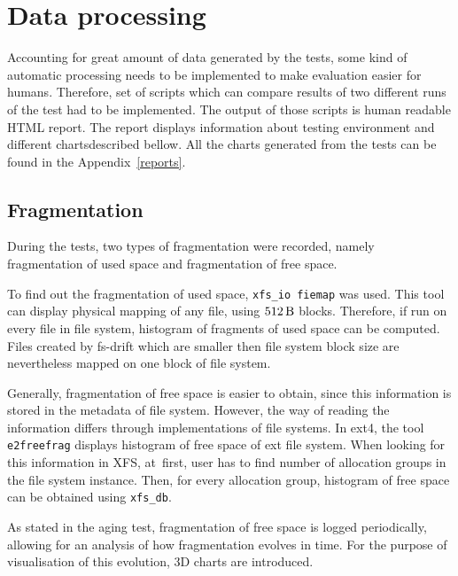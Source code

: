 \documentclass[
  color, %
  table, %
  lof,   %
  lot,   %
]{fithesis3}
\begin{document}
\section{Data processing}
Accounting for great amount of data generated by the tests, some kind of automatic processing needs to be implemented to make evaluation easier for humans. Therefore, set of scripts which can compare results of two different runs of the test had to be implemented. The output of those scripts is human readable HTML report\footnotemark[1]. The report displays information about testing environment and different charts\footnotemark[2] described bellow. All the charts generated from the tests can be found in the Appendix~\ref{reports}.


\subsection{Fragmentation}
During the tests, two types of fragmentation were recorded, namely fragmentation of used space and fragmentation of free space.

To find out the fragmentation of used space, \texttt{xfs\_io fiemap} was used. This tool can display physical mapping of any file, using $\SI{512}{\byte}$ blocks. Therefore, if run on every file in file system, histogram of fragments of used space can be computed. Files created by fs-drift which are smaller then file system block size are nevertheless mapped on one block of file system.

Generally, fragmentation of free space is easier to obtain, since this information is stored in the metadata of file system. However, the way of reading the information differs through implementations of file systems. In ext4, the tool \texttt{e2freefrag} displays histogram of free space of ext file system. When looking for this information in XFS, at~first, user has to find number of allocation groups in the file system instance. Then, for every allocation group, histogram of free space can be obtained using \texttt{xfs\_db}.

As stated in the aging test, fragmentation of free space is logged periodically, allowing for an analysis of how fragmentation evolves in time. For the purpose of visualisation of this evolution, 3D charts are introduced.
\end{document}
